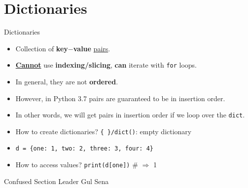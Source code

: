     \section{Dictionaries}
    \begin{frame}{Dictionaries}
        \Large
        \begin{itemize}
            \item Collection of \textbf{key$-$value} \underline{pairs}.
            \pause
            \item \underline{\textbf{Cannot}} use \textbf{indexing/slicing}, \textbf{can} iterate with \texttt{for} loops. 
            \pause
            \item In general, they are not \textbf{ordered}. 
            \pause
            \item However, in Python 3.7 pairs are guaranteed to be in insertion order.
            \pause
            \item In other words, we will get pairs in insertion order if we loop over the \texttt{dict}.
            \pause
            \item How to create dictionaries?
            \pause
             \texttt{\{\ \}/dict()}: empty dictionary
            \pause
            \item \texttt{d = \{\textquotesingle one\textquotesingle : 1, \textquotesingle two\textquotesingle : 2, \textquotesingle three\textquotesingle : 3, \textquotesingle four\textquotesingle : 4\}}
            \pause
            \item How to access values? 
            \pause
             \texttt{print(d[\textquotesingle one\textquotesingle ])} \# $\Rightarrow$ 1
        \end{itemize}
    \end{frame}

    \begin{frame}{Confused Section Leader Gul Sena}
        \inputminted[frame=single,framesep=2pt]{python3}{code-examples/dicts.py}
    \end{frame}

